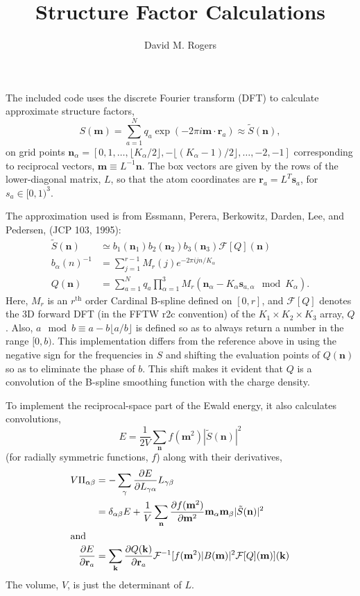 \documentclass{amsart}
\title{ Structure Factor Calculations}
\author{ David M. Rogers}
\renewcommand{\vec}[1]{\mathbf{#1}}
\begin{document}
  The included code uses the discrete Fourier transform (DFT)
to calculate approximate structure factors,
\begin{equation}
S(\vec m) = \sum_{a=1}^N q_a \exp(-2\pi i \vec m\cdot \vec r_a)
  \approx \tilde S(\vec n),
\end{equation}
on grid points $\vec n_\alpha = [0, 1, \ldots, \lfloor K_\alpha/2 \rfloor, -\lfloor (K_\alpha-1)/2 \rfloor, \ldots, -2, -1]$
corresponding to reciprocal vectors, $\vec m \equiv L^{-1} \vec n$.
The box vectors are given by the rows of the lower-diagonal matrix,
$L$, so that the atom coordinates are $\vec r_a = L^T \vec s_a$,
for $s_a \in [0,1)^3$.

  The approximation used is from Essmann, Perera, Berkowitz,
Darden, Lee, and Pedersen, (JCP 103, 1995):
\begin{align}
\tilde S(\vec n) &\simeq b_1(\vec n_1) b_2(\vec n_2) b_3(\vec n_3)
                         \mathcal F[Q](\vec n) \\
b_\alpha(n)^{-1} &= \sum_{j=1}^{r-1} M_r(j) e^{-2\pi i j n/K_\alpha} \\
Q(\vec n) &= \sum_{a=1}^N q_a \prod_{\alpha=1}^3
                M_r(\vec n_\alpha - K_\alpha \vec s_{a,\alpha} \mod K_\alpha)
.
\end{align}
Here, $M_r$ is an $r^\text{th}$ order Cardinal B-spline defined on $[0,r]$,
and $\mathcal F[Q]$ denotes the 3D forward DFT (in the FFTW r2c convention)
of the $K_1 \times K_2 \times K_3$ array, $Q$.
Also, $a \mod b \equiv a - b \lfloor a/b \rfloor$
is defined so as to always return a number in the range $[0,b)$.
This implementation differs from the reference above in using the negative
sign for the frequencies in $S$ and shifting the evaluation points
of $Q(\vec n)$ so as to eliminate the phase of $b$.  This
shift makes it evident that $Q$ is a convolution of the B-spline
smoothing function with the charge density.

  To implement the reciprocal-space part of the Ewald energy, it also
calculates convolutions,
\begin{equation}
E = \frac{1}{2 V} \sum_{\vec n} f(\vec m^2) |\tilde S(\vec n)|^2
\end{equation}
(for radially symmetric functions, $f$)
along with their derivatives,
\begin{align}
V \Pi_{\alpha\beta} &= -\sum_\gamma \frac{\partial E}{\partial L_{\gamma\alpha}}
            L_{\gamma\beta} \\
  &= \delta_{\alpha\beta} E
        + \frac{1}{V} \sum_{\vec n}
                            \frac{\partial f(\vec m^2)}{\partial \vec m^2}
            \vec m_\alpha \vec m_\beta |\tilde S(\vec n)|^2 \\
\intertext{and}
\frac{\partial E}{\partial \vec r_a} &= \sum_{\vec k}
  \frac{\partial Q(\vec k)}{\partial \vec r_a}
                    \mathcal F^{-1}[ f(\vec m^2) |B(\vec m)|^2 \mathcal F[Q](\vec m) ](\vec k)
\end{align}
The volume, $V$, is just the determinant of $L$.
\end{document}
